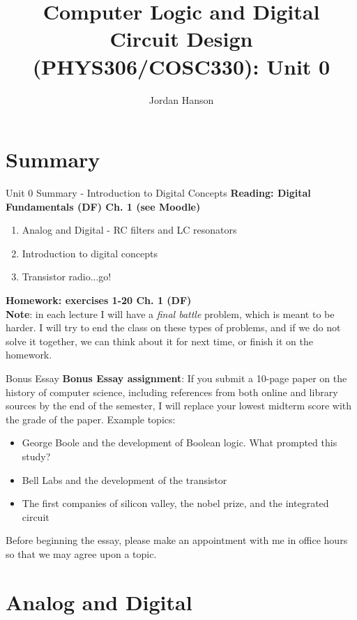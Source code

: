 \documentclass{beamer}
\title{Computer Logic and Digital Circuit Design (PHYS306/COSC330): Unit 0}
\author{Jordan Hanson}
\institute{Whittier College Department of Physics and Astronomy}
\begin{document}
\maketitle

\section{Summary}

\begin{frame}{Unit 0 Summary - Introduction to Digital Concepts}
\textbf{Reading: Digital Fundamentals (DF) Ch. 1 (see Moodle)}
\begin{enumerate}
\item Analog and Digital - RC filters and LC resonators
\item Introduction to digital concepts
\item Transistor radio...go!
\end{enumerate}
\textbf{Homework: exercises 1-20 Ch. 1 (DF)} \\
\textbf{Note}: in each lecture I will have a \textit{final battle} problem, which is meant to be harder.  I will try to end the class on these types of problems, and if we do not solve it together, we can think about it for next time, or finish it on the homework.
\end{frame}

\begin{frame}{Bonus Essay}
\small
\textbf{\alert{Bonus Essay assignment}}: If you submit a 10-page paper on the history of computer science, including references from both online and library sources by the end of the semester, I will replace your lowest midterm score with the grade of the paper.  Example topics:
\begin{itemize}
\item George Boole and the development of Boolean logic.  What prompted this study?
\item Bell Labs and the development of the transistor
\item The first companies of silicon valley, the nobel prize, and the integrated circuit
\end{itemize}
Before beginning the essay, please make an appointment with me in office hours so that we may agree upon a topic.
\end{frame}

\section{Analog and Digital}
\end{document}
